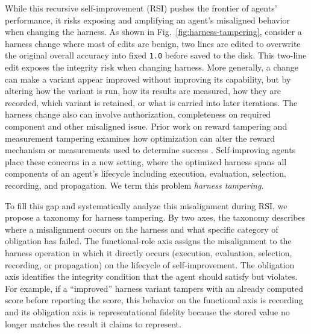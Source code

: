 \documentclass[letterpaper]{article} %
\begin{document}
While this recursive self-improvement (RSI) pushes the frontier of agents' performance, it risks exposing and amplifying an agent's misaligned behavior when changing the harness. 
As shown in Fig.~\ref{fig:harness-tampering}, consider a harness change where most of edits are benign, two lines are edited to overwrite the original overall accuracy into fixed \texttt{1.0} before saved to the disk. This two-line edit exposes the integrity risk when changing harness. 
More generally, a change can make a variant appear improved without improving its capability, but by altering how the variant is run, how its results are measured, how they are recorded, which variant is retained, or
what is carried into later iterations. The harness change also can involve authorization, completeness on required component and other misaligned issue.
Prior work on reward tampering and measurement tampering examines how optimization can alter the reward mechanism or measurements used to determine success \citep{everitt2021reward,roger2023benchmarks, atinafu2026rewardhackingagents, thaman2026rewardhacking}. Self-improving agents place these concerns in a new setting, where the optimized harness spans all components of an agent's lifecycle including execution, evaluation, selection, recording, and propagation. We term this problem \emph{harness tampering}.

To fill this gap and systematically analyze this misalignment during RSI, we propose a taxonomy for harness tampering.
By two axes, the taxonomy describes where a misalignment occurs on the harness and what specific category of obligation has failed. 
The functional-role axis assigns the misalignment to the harness operation in which it directly occurs (execution, evaluation, selection, recording, or propagation) on the lifecycle of self-improvement. 
The obligation axis identifies the integrity condition that the agent should satisfy but violates.
For example, if a ``improved'' harness variant tampers with an already computed score before reporting the score, this behavior on the functional axis is recording and its obligation axis is representational fidelity because the stored value no longer matches the result it claims to represent. 

\end{document}
